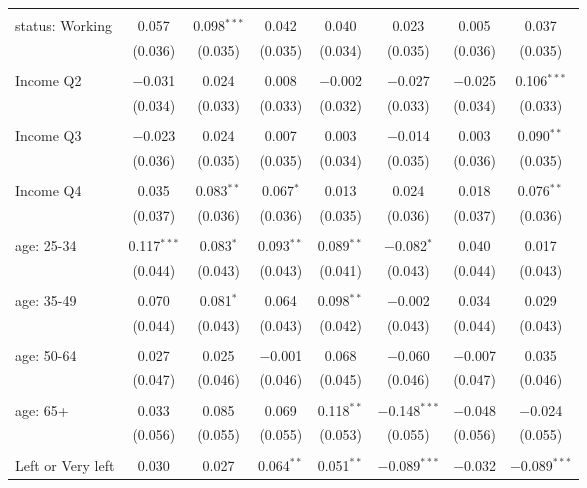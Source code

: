 \begin{tabular}{@{\extracolsep{5pt}}lccccccc}
  & & & & & & & \\ 
 status: Working & 0.057 & 0.098$^{***}$ & 0.042 & 0.040 & 0.023 & 0.005 & 0.037 \\ 
  & (0.036) & (0.035) & (0.035) & (0.034) & (0.035) & (0.036) & (0.035) \\ 
  & & & & & & & \\ 
 Income Q2 & $-$0.031 & 0.024 & 0.008 & $-$0.002 & $-$0.027 & $-$0.025 & 0.106$^{***}$ \\ 
  & (0.034) & (0.033) & (0.033) & (0.032) & (0.033) & (0.034) & (0.033) \\ 
  & & & & & & & \\ 
 Income Q3 & $-$0.023 & 0.024 & 0.007 & 0.003 & $-$0.014 & 0.003 & 0.090$^{**}$ \\ 
  & (0.036) & (0.035) & (0.035) & (0.034) & (0.035) & (0.036) & (0.035) \\ 
  & & & & & & & \\ 
 Income Q4 & 0.035 & 0.083$^{**}$ & 0.067$^{*}$ & 0.013 & 0.024 & 0.018 & 0.076$^{**}$ \\ 
  & (0.037) & (0.036) & (0.036) & (0.035) & (0.036) & (0.037) & (0.036) \\ 
  & & & & & & & \\ 
 age: 25-34 & 0.117$^{***}$ & 0.083$^{*}$ & 0.093$^{**}$ & 0.089$^{**}$ & $-$0.082$^{*}$ & 0.040 & 0.017 \\ 
  & (0.044) & (0.043) & (0.043) & (0.041) & (0.043) & (0.044) & (0.043) \\ 
  & & & & & & & \\ 
 age: 35-49 & 0.070 & 0.081$^{*}$ & 0.064 & 0.098$^{**}$ & $-$0.002 & 0.034 & 0.029 \\ 
  & (0.044) & (0.043) & (0.043) & (0.042) & (0.043) & (0.044) & (0.043) \\ 
  & & & & & & & \\ 
 age: 50-64 & 0.027 & 0.025 & $-$0.001 & 0.068 & $-$0.060 & $-$0.007 & 0.035 \\ 
  & (0.047) & (0.046) & (0.046) & (0.045) & (0.046) & (0.047) & (0.046) \\ 
  & & & & & & & \\ 
 age: 65+ & 0.033 & 0.085 & 0.069 & 0.118$^{**}$ & $-$0.148$^{***}$ & $-$0.048 & $-$0.024 \\ 
  & (0.056) & (0.055) & (0.055) & (0.053) & (0.055) & (0.056) & (0.055) \\ 
  & & & & & & & \\ 
 Left or Very left & 0.030 & 0.027 & 0.064$^{**}$ & 0.051$^{**}$ & $-$0.089$^{***}$ & $-$0.032 & $-$0.089$^{***}$ \\ 

\end{tabular}
